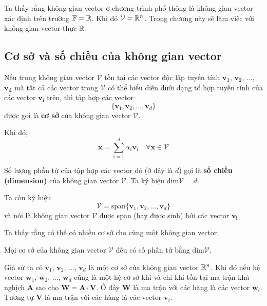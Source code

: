 Ta thấy rằng không gian vector ở chương trình phổ thông là không gian vector xác định trên trường $\mathbb{F} = \mathbb{R}$.
Khi đó $\mathcal{V} = \mathbb{R}^n$. Trong chương này sẽ làm việc với không gian vector thực $\mathbb{R}$.

\subsection*{Cơ sở và số chiều của không gian vector}

Nếu trong không gian vector $\mathcal{V}$ tồn tại các vector độc lập tuyến tính $\bm{v_1}$, $\bm{v_2}$, ..., $\bm{v_d}$
mà tất cả các vector trong $\mathcal{V}$ có thể biểu diễn dưới dạng tổ hợp tuyến tính của các vector $\bm{v_i}$ trên,
thì tập hợp các vector 
\[\{ \bm{v}_1, \bm{v}_2, \ldots, \bm{v}_d \}\]
được gọi là \textbf{cơ sở} của không gian vector $\mathcal{V}$.

Khi đó,
\[\bm{x} = \sum_{i=1}^{d} \alpha_i \bm{v}_i \quad \forall \bm{x} \in \mathcal{V}\]

Số lượng phần tử của tập hợp các vector đó (ở đây là $d$) gọi là \textbf{số chiều (dimension)} của không gian vector $\mathcal{V}$.
Ta ký hiệu $\text{dim} \mathcal{V} = d$.

Ta còn ký hiệu 
\[\mathcal{V} = \text{span} \{\bm{v}_1, \bm{v}_2, \ldots, \bm{v}_d\}\]
và nói là không gian vector $\mathcal{V}$ được span (hay được sinh) bởi các vector $\bm{v_i}$.

Ta thấy rằng có thể có nhiều cơ sở cho cùng một không gian vector.

\begin{theorem}
    Mọi cơ sở của không gian vector $\mathcal{V}$ đều có số phần tử bằng $\text{dim} \mathcal{V}$.
\end{theorem}

Giả sử ta có $\bm{v}_1$, $\bm{v}_2$, ..., $\bm{v}_d$ là một cơ sở của không gian vector $\mathbb{R}^n$.
Khi đó nếu hệ vector $\bm{w}_1$, $\bm{w}_2$, ..., $\bm{w}_d$ cũng là một hệ cơ sở khi và chỉ khi tồn 
tại ma trận khả nghịch $\bm{A}$ sao cho $\bm{W} = \bm{A} \cdot \bm{V}$. Ở đây $\bm{W}$ là ma trận với các hàng là các vector $\bm{w}_i$. Tương tự $\bm{V}$ là ma trận với các hàng là các vector $\bm{v}_i$.

